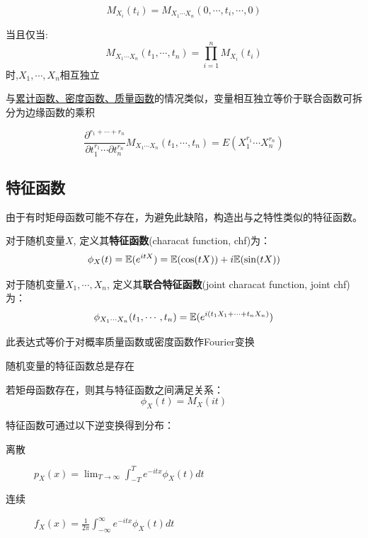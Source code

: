 \begin{proposition}
    \[ M_{X_i}(t_i) = M_{X_1\cdots X_n}(0,\cdots ,t_i,\cdots ,0) \]
\end{proposition}

\begin{theorem}
    当且仅当:
    \[ M_{X_1\cdots X_n}(t_1,\cdots ,t_n) = \prod_{i=1}^n M_{X_i}(t_i) \]
    时,$X_1,\cdots, X_n$相互独立
\end{theorem}

\begin{remark}
    与\underline{累计函数、密度函数、质量函数}的情况类似，变量相互独立等价于联合函数可拆分为边缘函数的乘积
\end{remark}

\begin{theorem}
    \[ \frac{\partial^{r_1+\cdots +r_n} }{\partial t_1^{r_1} \cdots  \partial t_n^{r_n}} M_{X_1\cdots X_n}(t_1,\cdots ,t_n) = E(X_1^{r_1} \cdots X_n^{r_n}) \]
\end{theorem}

\subsection{特征函数}

由于有时矩母函数可能不存在，为避免此缺陷，构造出与之特性类似的特征函数。

\begin{definition}
    对于随机变量$X$, 定义其\textbf{特征函数}(characat function, chf)为：
    \[ \phi_X(t) = \mathbb{E}(e^{itX}) = \mathbb{E}(\cos (tX)) + i\mathbb{E}(\sin (tX))\]

    对于随机变量$X_1,\cdots, X_n$, 定义其\textbf{联合特征函数}(joint characat function, joint chf)为：
    \[ \phi_{X_1\cdots X_n}(t_1,\cdots ,t_n) = \mathbb{E}(e^{i (t_1 X_1+\cdots + t_n X_n)}) \]
\end{definition}

\begin{remark}
    此表达式等价于对概率质量函数或密度函数作Fourier变换
\end{remark}

\begin{proposition}
    随机变量的特征函数总是存在
\end{proposition}

\begin{proposition}
    若矩母函数存在，则其与特征函数之间满足关系：
    \[ \phi_X(t) = M_X(it) \]
\end{proposition}

\begin{theorem}
    特征函数可通过以下逆变换得到分布：
    \begin{description}
        \item[离散]$p_X(x)=\lim _{T \rightarrow \infty} \int_{-T}^{T} e^{-i t x} \phi_X(t) d t$
        \item[连续]$f_X(x)=\frac1{2 \pi} \int_{-\infty}^{\infty} e^{-i t x} \phi_X(t) d t$
    \end{description}
\end{theorem}

